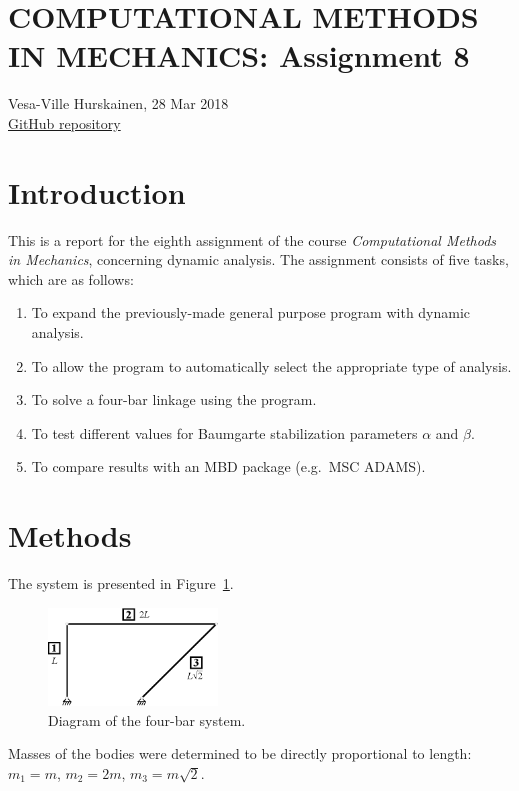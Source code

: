 \documentclass{article}
\begin{document}
\section*{COMPUTATIONAL METHODS IN MECHANICS: Assignment 8}
Vesa-Ville Hurskainen, 28 Mar 2018\\
\href{https://github.com/VesaVilleHurskainen/cmim2018}{GitHub repository}


\section*{Introduction}
This is a report for the eighth assignment of the course \textit{Computational Methods in Mechanics}, concerning dynamic analysis. The assignment consists of five tasks, which are as follows:
\begin{enumerate}
	\setlength\itemsep{0pt}
	\item To expand the previously-made general purpose program with dynamic analysis.
	\item To allow the program to automatically select the appropriate type of analysis.
	\item To solve a four-bar linkage using the program.
	\item To test different values for Baumgarte stabilization parameters $\alpha$ and $\beta$.
	\item To compare results with an MBD package (e.g.~MSC ADAMS).
\end{enumerate}


\section*{Methods}
The system is presented in Figure~\ref*{fig:system}.
\begin{figure}[htb]
	\centering
	\includegraphics[width=0.4\textwidth]{system.eps}
	\caption{Diagram of the four-bar system.\label{fig:system}}
\end{figure}

Masses of the bodies were determined to be directly proportional to length: $m_1 = m$, $m_2 = 2m$, $m_3 = m \sqrt{2}$.
\end{document}
